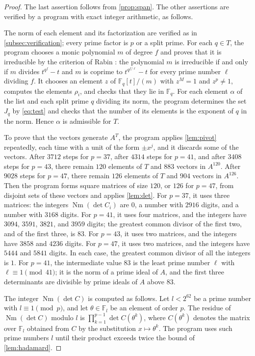 \documentclass[11pt]{amsart}
\theoremstyle{plain}
\theoremstyle{definition}
\begin{document}
\begin{proof}
The last assertion follows from \cref{prop:span}.
The other assertions are verified by a program with exact integer arithmetic, as follows.

The norm of each element and its factorization are verified as in \cref{subsec:verification}; every prime factor is $p$ or a split prime.
For each $q \in T$, the program chooses a monic polynomial $m$ of degree $f$ and proves that it is irreducible by the criterion of Rabin \cite{Ra80}: the polynomial $m$ is irreducible if and only if $m$ divides $t^{q^f} - t$ and $m$ is coprime to $t^{q^{f/\ell}} - t$ for every prime number $\ell$ dividing $f$.
It chooses an element $z$ of $\mathbb{F}_q[t]/(m)$ with $z^M = 1$ and $z^p \ne 1$, computes the elements $\rho_i$, and checks that they lie in $\mathbb{F}_q$.
For each element $\alpha$ of the list and each split prime $q$ dividing its norm, the program determines the set $J_q$ by \eqref{eq:test} and checks that the number of its elements is the exponent of $q$ in the norm.
Hence $\alpha$ is admissible for $T$.

To prove that the vectors generate $A^T$, the program applies \cref{lem:pivot} repeatedly, each time with a unit of the form $\pm x^j$, and it discards some of the vectors.
After $3712$ steps for $p = 37$, after $4314$ steps for $p = 41$, and after $3408$ steps for $p = 43$, there remain $120$ elements of $T$ and $883$ vectors in $A^{120}$.
After $9028$ steps for $p = 47$, there remain $126$ elements of $T$ and $904$ vectors in $A^{126}$.
Then the program forms square matrices of size $120$, or $126$ for $p = 47$, from disjoint sets of these vectors and applies \cref{lem:det}.
For $p = 37$, it uses three matrices: the integers $\operatorname{Nm}(\det C_i)$ are $0$, a number with $2916$ digits, and a number with $3168$ digits.
For $p = 41$, it uses four matrices, and the integers have $3094$, $3591$, $3821$, and $3959$ digits; the greatest common divisor of the first two, and of the first three, is $83$.
For $p = 43$, it uses two matrices, and the integers have $3858$ and $4236$ digits.
For $p = 47$, it uses two matrices, and the integers have $5444$ and $5841$ digits.
In each case, the greatest common divisor of all the integers is $1$.
For $p = 41$, the intermediate value $83$ is the least prime number $\ell$ with $\ell \equiv 1 \pmod{41}$; it is the norm of a prime ideal of $A$, and the first three determinants are divisible by prime ideals of $A$ above $83$.

The integer $\operatorname{Nm}(\det C)$ is computed as follows.
Let $l < 2^{62}$ be a prime number with $l \equiv 1 \pmod{p}$, and let $\theta \in \mathbb{F}_l$ be an element of order $p$.
The residue of $\operatorname{Nm}(\det C)$ modulo $l$ is $\prod_{k=1}^{p-1} \det C(\theta^k)$, where $C(\theta^k)$ denotes the matrix over $\mathbb{F}_l$ obtained from $C$ by the substitution $x \mapsto \theta^k$.
The program uses such prime numbers $l$ until their product exceeds twice the bound of \cref{lem:hadamard}.
\end{proof}
\end{document}
